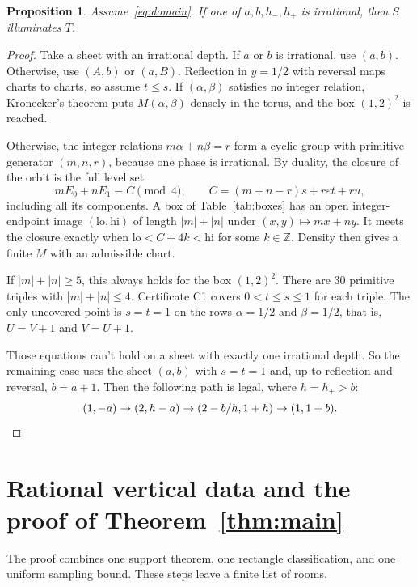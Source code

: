 \documentclass[11pt]{article}
\newtheorem{proposition}{Proposition}
\theoremstyle{remark}
\begin{document}
\begin{proposition}\label{prop:irrational}
Assume~\eqref{eq:domain}. If one of $a,b,h_-,h_+$ is irrational, then $S$ illuminates $T$.
\end{proposition}
\begin{proof}
Take a sheet with an irrational depth. If $a$ or $b$ is irrational, use $(a,b)$. Otherwise, use $(A,b)$ or $(a,B)$. Reflection in $y=1/2$ with reversal maps charts to charts, so assume $t\le s$. If $(\alpha,\beta)$ satisfies no integer relation, Kronecker's theorem puts $M(\alpha,\beta)$ densely in the torus, and the box $(1,2)^2$ is reached.

Otherwise, the integer relations $m\alpha+n\beta=r$ form a cyclic group with primitive generator $(m,n,r)$, because one phase is irrational. By duality, the closure of the orbit is the full level set
\begin{equation}\label{eq:level}
mE_0+nE_1\equiv C\pmod 4,\qquad C=(m+n-r)s+r\varepsilon t+ru,
\end{equation}
including all its components. A box of Table~\ref{tab:boxes} has an open integer-endpoint image $(\mathrm{lo},\mathrm{hi})$ of length $|m|+|n|$ under $(x,y)\mapsto mx+ny$. It meets the closure exactly when $\mathrm{lo}<C+4k<\mathrm{hi}$ for some $k\in\mathbb{Z}$. Density then gives a finite $M$ with an admissible chart.

If $|m|+|n|\ge5$, this always holds for the box $(1,2)^2$. There are 30 primitive triples with $|m|+|n|\le4$. Certificate C1 covers $0<t\le s\le1$ for each triple. The only uncovered point is $s=t=1$ on the rows $\alpha=1/2$ and $\beta=1/2$, that is, $U=V+1$ and $V=U+1$.

Those equations can't hold on a sheet with exactly one irrational depth. So the remaining case uses the sheet $(a,b)$ with $s=t=1$ and, up to reflection and reversal, $b=a+1$. Then the following path is legal, where $h=h_+>b$:
\[
(1,-a)\to(2,h-a)\to(2-b/h,1+h)\to(1,1+b).\qedhere
\]
\end{proof}

\section{Rational vertical data and the proof of Theorem~\ref{thm:main}}\label{sec:rational}
The proof combines one support theorem, one rectangle classification, and one uniform sampling bound. These steps leave a finite list of rooms.
\end{document}
